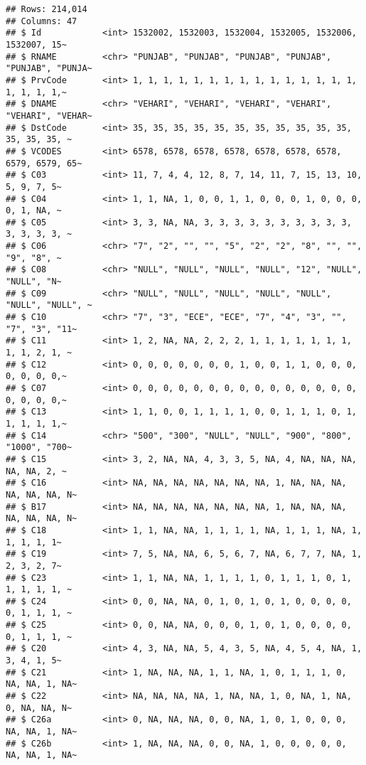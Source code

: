 \documentclass[
]{article}
\begin{document}
\begin{verbatim}
## Rows: 214,014
## Columns: 47
## $ Id            <int> 1532002, 1532003, 1532004, 1532005, 1532006, 1532007, 15~
## $ RNAME         <chr> "PUNJAB", "PUNJAB", "PUNJAB", "PUNJAB", "PUNJAB", "PUNJA~
## $ PrvCode       <int> 1, 1, 1, 1, 1, 1, 1, 1, 1, 1, 1, 1, 1, 1, 1, 1, 1, 1, 1,~
## $ DNAME         <chr> "VEHARI", "VEHARI", "VEHARI", "VEHARI", "VEHARI", "VEHAR~
## $ DstCode       <int> 35, 35, 35, 35, 35, 35, 35, 35, 35, 35, 35, 35, 35, 35, ~
## $ VCODES        <int> 6578, 6578, 6578, 6578, 6578, 6578, 6578, 6579, 6579, 65~
## $ C03           <int> 11, 7, 4, 4, 12, 8, 7, 14, 11, 7, 15, 13, 10, 5, 9, 7, 5~
## $ C04           <int> 1, 1, NA, 1, 0, 0, 1, 1, 0, 0, 0, 1, 0, 0, 0, 0, 1, NA, ~
## $ C05           <int> 3, 3, NA, NA, 3, 3, 3, 3, 3, 3, 3, 3, 3, 3, 3, 3, 3, 3, ~
## $ C06           <chr> "7", "2", "", "", "5", "2", "2", "8", "", "", "9", "8", ~
## $ C08           <chr> "NULL", "NULL", "NULL", "NULL", "12", "NULL", "NULL", "N~
## $ C09           <chr> "NULL", "NULL", "NULL", "NULL", "NULL", "NULL", "NULL", ~
## $ C10           <chr> "7", "3", "ECE", "ECE", "7", "4", "3", "", "7", "3", "11~
## $ C11           <int> 1, 2, NA, NA, 2, 2, 2, 1, 1, 1, 1, 1, 1, 1, 1, 1, 2, 1, ~
## $ C12           <int> 0, 0, 0, 0, 0, 0, 0, 1, 0, 0, 1, 1, 0, 0, 0, 0, 0, 0, 0,~
## $ C07           <int> 0, 0, 0, 0, 0, 0, 0, 0, 0, 0, 0, 0, 0, 0, 0, 0, 0, 0, 0,~
## $ C13           <int> 1, 1, 0, 0, 1, 1, 1, 1, 0, 0, 1, 1, 1, 0, 1, 1, 1, 1, 1,~
## $ C14           <chr> "500", "300", "NULL", "NULL", "900", "800", "1000", "700~
## $ C15           <int> 3, 2, NA, NA, 4, 3, 3, 5, NA, 4, NA, NA, NA, NA, NA, 2, ~
## $ C16           <int> NA, NA, NA, NA, NA, NA, NA, 1, NA, NA, NA, NA, NA, NA, N~
## $ B17           <int> NA, NA, NA, NA, NA, NA, NA, 1, NA, NA, NA, NA, NA, NA, N~
## $ C18           <int> 1, 1, NA, NA, 1, 1, 1, 1, NA, 1, 1, 1, NA, 1, 1, 1, 1, 1~
## $ C19           <int> 7, 5, NA, NA, 6, 5, 6, 7, NA, 6, 7, 7, NA, 1, 2, 3, 2, 7~
## $ C23           <int> 1, 1, NA, NA, 1, 1, 1, 1, 0, 1, 1, 1, 0, 1, 1, 1, 1, 1, ~
## $ C24           <int> 0, 0, NA, NA, 0, 1, 0, 1, 0, 1, 0, 0, 0, 0, 0, 1, 1, 1, ~
## $ C25           <int> 0, 0, NA, NA, 0, 0, 0, 1, 0, 1, 0, 0, 0, 0, 0, 1, 1, 1, ~
## $ C20           <int> 4, 3, NA, NA, 5, 4, 3, 5, NA, 4, 5, 4, NA, 1, 3, 4, 1, 5~
## $ C21           <int> 1, NA, NA, NA, 1, 1, NA, 1, 0, 1, 1, 1, 0, NA, NA, 1, NA~
## $ C22           <int> NA, NA, NA, NA, 1, NA, NA, 1, 0, NA, 1, NA, 0, NA, NA, N~
## $ C26a          <int> 0, NA, NA, NA, 0, 0, NA, 1, 0, 1, 0, 0, 0, NA, NA, 1, NA~
## $ C26b          <int> 1, NA, NA, NA, 0, 0, NA, 1, 0, 0, 0, 0, 0, NA, NA, 1, NA~

\end{verbatim}
\end{document}
